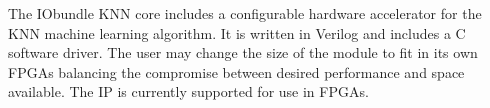 The IObundle KNN core includes a configurable hardware accelerator for the KNN
machine learning algorithm. It is written in Verilog and includes a C software
driver. The user may change the size of the module to fit in its own FPGAs
balancing the compromise between desired performance and space available. The IP
is currently supported for use in FPGAs.
